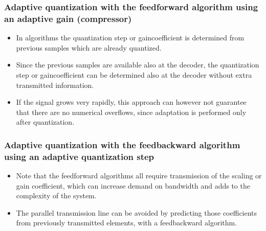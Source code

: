 \documentclass[letterpaper,10pt,english]{jupyterBook}
\begin{document}
\sphinxAtStartPar
{}


\subsubsection{Adaptive quantization with the feed\sphinxhyphen{}forward algorithm using an adaptive gain (compressor)}
\label{\detokenize{Representations/Waveform:adaptive-quantization-with-the-feed-forward-algorithm-using-an-adaptive-gain-compressor}}\begin{itemize}
\item {} 
\sphinxAtStartPar
In  algorithms the quantization step or
gain\sphinxhyphen{}coefficient is determined from previous samples which are
already quantized.

\item {} 
\sphinxAtStartPar
Since the previous samples are available also at the decoder, the quantization step or gain\sphinxhyphen{}coefficient can be determined also at the decoder without extra transmitted information.

\item {} 
\sphinxAtStartPar
If the signal grows very rapidly, this approach can however not guarantee that there are no numerical overflows, since adaptation is performed only after quantization.

\end{itemize}

\sphinxAtStartPar
{}


\subsubsection{Adaptive quantization with the feed\sphinxhyphen{}backward algorithm using an adaptive quantization step}
\label{\detokenize{Representations/Waveform:adaptive-quantization-with-the-feed-backward-algorithm-using-an-adaptive-quantization-step}}\begin{itemize}
\item {} 
\sphinxAtStartPar
Note that the feed\sphinxhyphen{}forward algorithms all require transmission of the scaling or gain coefficient, which can increase demand on bandwidth and adds to the complexity of the system.

\item {} 
\sphinxAtStartPar
The parallel transmission line can be avoided by predicting those
coefficients from previously transmitted elements, with a
feed\sphinxhyphen{}backward algorithm.

\end{itemize}
\end{document}

